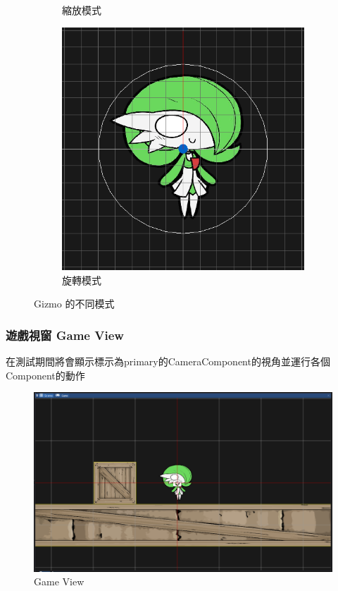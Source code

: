 \begin{figure}[h]
\begin{subfigure}[h]{0.2\linewidth}
        \caption{縮放模式}
    \end{subfigure}
    \begin{subfigure}[h]{0.2\linewidth}
        \includegraphics[width=\linewidth]{./resources/editor/gizmo_d.png}
        \caption{旋轉模式}
    \end{subfigure}
\caption{Gizmo 的不同模式}
\label{fig:Gizmo}
\end{figure}

\subsubsection{遊戲視窗 Game View}

在測試期間將會顯示標示為primary的CameraComponent的視角並運行各個Component的動作

\begin{figure}[h]
    \begin{center}
    \includegraphics[width=0.6\linewidth]{./resources/editor/sceneView.png}
    \end{center}
\caption{Game View}
\label{gameView}
\end{figure}


